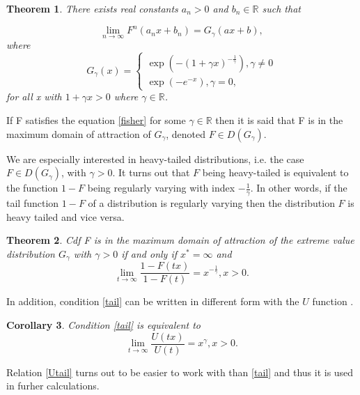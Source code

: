 \documentclass[english,12pt,a4paper,pdftex,sci,utf8]{aaltothesis} %
\newtheorem{theorem}{Theorem}[section]
\newtheorem{corollary}[theorem]{Corollary}
\begin{document}
\begin{theorem}
There exists real constants $a_n>0$ and $b_n \in \mathbb{R}$ such that 

\begin{equation}
\lim_{n\to\infty} F^n(a_nx + b_n) = G_{\gamma}(ax+b),
\label{fisher}
\end{equation}
where
\begin{equation*}
G_{\gamma}(x)=
\begin{cases}
\exp(-(1 + \gamma x)^{-\frac{1}{\gamma}}), \gamma \neq 0 \\
\exp(-e^{-x}), \gamma = 0,
\end{cases}
\label{mdaEq}
\end{equation*}
for all x with $1+\gamma x > 0$ where $\gamma \in \mathbb{R}$.
\end{theorem}
If F satisfies the equation \ref{fisher} for some $\gamma \in \mathbb{R}$ then it is said that F is in the maximum domain of attraction of $G_{\gamma}$, denoted $F \in D(G_{\gamma})$.

We are especially interested in heavy-tailed distributions, i.e. the case $F \in D(G_{\gamma})$, with $\gamma>0$. It turns out that $F$ being heavy-tailed is equivalent to the function $1-F$ being regularly varying with index $-\frac{1}{\gamma}$. In other words, if the tail function $1-F$ of a distribution is regularly varying then the distribution $F$ is heavy tailed and vice versa. \cite{deHaan}

\begin{theorem}
Cdf F is in the maximum domain of attraction of the extreme value distribution $G_{\gamma}$ with $\gamma>0$ if and only if $x^*=\infty$ and
\begin{equation}
\lim_{t\rightarrow \infty} \frac{1-F(tx)}{1-F(t)} = x^{-\frac{1}{\gamma}}, x>0.
\label{tail}
\end{equation}
\end{theorem}

In addition, condition \eqref{tail} can be written in different form with the $U$ function \cite{deHaan}.

\begin{corollary}
Condition \ref{tail} is equivalent to
\begin{equation}
\lim_{t \rightarrow \infty} \frac{U(tx)}{U(t)} = x^{\gamma}, x>0.
\label{Utail}
\end{equation}
\end{corollary}

Relation \eqref{Utail} turns out to be easier to work with than \eqref{tail} and thus it is used in furher calculations.
\end{document}
